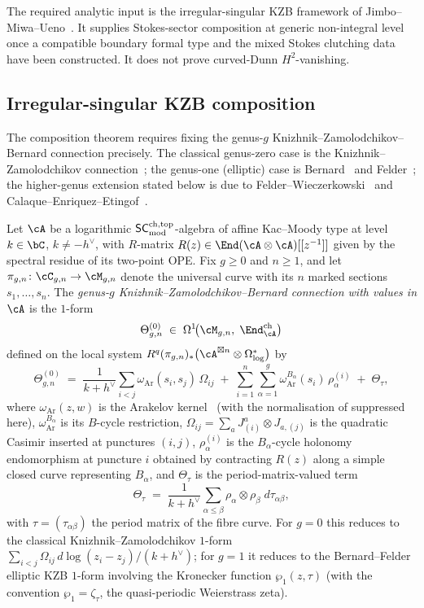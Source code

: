 The required analytic input is the irregular-singular KZB framework of
Jimbo--Miwa--Ueno~\cite{JMU81}. It supplies Stokes-sector composition
at generic non-integral level once a compatible boundary formal type
and the mixed Stokes clutching data have been constructed. It does not
prove curved-Dunn \(H^2\)-vanishing.

\subsection{Irregular-singular KZB composition}
\label{subsec:irregular-kzb}

The composition theorem requires fixing the genus-$g$
Knizhnik--Zamolodchikov--Bernard connection precisely. The classical
genus-zero case is the Knizhnik--Zamolodchikov
connection~\cite{KnizhnikZamolodchikov1984}; the genus-one (elliptic)
case is Bernard~\cite{Bernard1988} and
Felder~\cite{Felder1994}; the higher-genus extension stated below is
due to Felder--Wieczerkowski~\cite{FelderWieczerkowski1996} and
Calaque--Enriquez--Etingof~\cite{CalaqueEnriquezEtingof2009}.

\begin{definition}
\label{def:kzb-genus-g}
Let $\cA$ be a logarithmic $\mathsf{SC}^{\mathrm{ch,top}}_{\mathrm{mod}}$-algebra of affine Kac--Moody type
at level $k \in \bC$, $k \ne -h^\vee$, with $R$-matrix $R(z) \in
\End(\cA \otimes \cA)[[z^{-1}]]$ given by the spectral residue of its
two-point OPE. Fix $g \ge 0$ and $n \ge 1$, and let
$\pi_{g,n} \colon \cC_{g,n} \to \cM_{g,n}$ denote the universal curve
with its $n$ marked sections $s_1,\dots,s_n$. The \emph{genus-$g$
Knizhnik--Zamolodchikov--Bernard connection with values in $\cA$} is
the $1$-form
\[
 \Theta^{(0)}_{g,n}
 \;\in\;
 \Omega^{1}\!\bigl(\cM_{g,n},\;\End^{\mathrm{ch}}_{\cA}\bigr)
\]
defined on the local system $R^{q}(\pi_{g,n})_{*}\bigl(\cA^{\boxtimes
n} \otimes \Omega^{*}_{\log}\bigr)$ by
\[
 \Theta^{(0)}_{g,n}
 \;=\;
 \frac{1}{k + h^\vee}
 \sum_{i<j} \omega_{\mathrm{Ar}}(s_i,s_j)\,\Omega_{ij}
 \;+\;
 \sum_{i=1}^{n} \sum_{\alpha=1}^{g}
 \omega_{\mathrm{Ar}}^{B_\alpha}(s_i)\,\rho_\alpha^{(i)}
 \;+\;
 \Theta_{\tau},
\]
where $\omega_{\mathrm{Ar}}(z,w)$ is the Arakelov
kernel~\cite{Arakelov1974, Faltings1984} (with the normalisation of
suppressed here), $\omega_{\mathrm{Ar}}^{B_\alpha}$ is its
$B$-cycle restriction, $\Omega_{ij} = \sum_a J^a_{(i)} \otimes
J_{a,(j)}$ is the quadratic Casimir inserted at punctures $(i,j)$,
$\rho_\alpha^{(i)}$ is the $B_\alpha$-cycle holonomy endomorphism at
puncture $i$ obtained by contracting $R(z)$ along a simple closed
curve representing $B_\alpha$, and $\Theta_\tau$ is the
period-matrix-valued term
\[
 \Theta_\tau
 \;=\;
 \frac{1}{k + h^\vee}
 \sum_{\alpha \le \beta}
 \rho_\alpha \otimes \rho_\beta \; d\tau_{\alpha\beta},
\]
with $\tau = (\tau_{\alpha\beta})$ the period matrix of the fibre
curve. For $g = 0$ this reduces to the classical Knizhnik--Zamolodchikov
$1$-form $\sum_{i<j} \Omega_{ij}\, d\log(z_i - z_j)/(k+h^\vee)$; for
$g = 1$ it reduces to the Bernard--Felder elliptic KZB $1$-form
involving the Kronecker function $\wp_1(z,\tau)$ (with the convention
$\wp_1 = \zeta_\tau$, the quasi-periodic Weierstrass zeta).
\end{definition}

